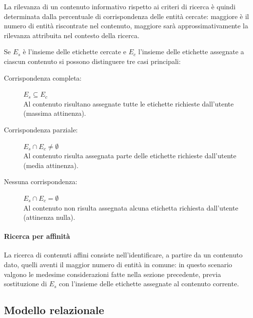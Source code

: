 La rilevanza di un contenuto informativo rispetto ai criteri di ricerca è quindi determinata dalla percentuale di corrispondenza delle entità cercate: maggiore è il numero di entità riscontrate nel contenuto, maggiore sarà approssimativamente la rilevanza attribuita nel contesto della ricerca.

Se $E_s$ è l'insieme delle etichette cercate e $E_c$ l'insieme delle etichette assegnate a ciascun contenuto si possono distinguere tre casi principali:
\begin{description}
\item[Corrispondenza completa:] $E_s \subseteq E_c$ \hfill \\
Al contenuto risultano assegnate tutte le etichette richieste dall'utente (massima attinenza).
\item[Corrispondenza parziale:] $E_s \cap E_c \neq \emptyset$ \hfill \\
Al contenuto risulta assegnata parte delle etichette richieste dall'utente (media attinenza).
\item[Nessuna corrispondenza:] $E_s \cap E_c = \emptyset$\hfill \\
Al contenuto non risulta assegnata alcuna etichetta richiesta dall'utente (attinenza nulla).
\end{description}

\paragraph{Ricerca per affinità}
La ricerca di contenuti affini consiste nell'identificare, a partire da un contenuto dato, quelli aventi il maggior numero di entità in comune: in questo scenario valgono le medesime considerazioni fatte nella sezione precedente, previa sostituzione di $E_s$ con l'insieme delle etichette assegnate al contenuto corrente.

\subsection{Modello relazionale}

